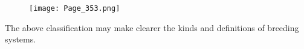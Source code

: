 \begin{figure}[htbp]
	\centering
    \texttt{[image: Page\_353.png]}
    \label{fig:Lush_Page_353}
\end{figure}

The above classification may make clearer the kinds and definitions of breeding systems.
